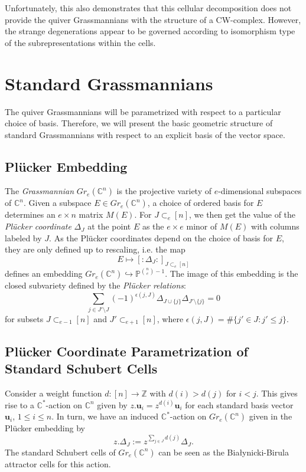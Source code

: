 \documentclass{amsart}
\numberwithin{equation}{section}
\newcommand{\CC}{\mathbb{C}}
\newcommand{\PP}{\mathbb{P}}
\newcommand{\ZZ}{\mathbb{Z}}
\newcommand{\bfu}{\mathbf{u}}
\newcommand{\into}{\hookrightarrow}
\begin{document}
  Unfortunately, this also demonstrates that this cellular decomposition does not provide the quiver Grassmannians with the structure of a CW-complex.
  However, the strange degenerations appear to be governed according to isomorphism type of the subrepresentations within the cells.


\section{Standard Grassmannians}
  \label{sec:standard Grassmannians}

  The quiver Grassmannians will be parametrized with respect to a particular choice of basis.
  Therefore, we will present the basic geometric structure of standard Grassmannians with respect to an explicit basis of the vector space.

  \subsection{Pl\"ucker Embedding}
  The \emph{Grassmannian} $Gr_e(\CC^n)$ is the projective variety of $e$-dimensional subspaces of $\CC^n$.
  Given a subspace $E \in Gr_e(\CC^n)$, a choice of ordered basis for $E$ determines an $e\times n$ matrix $M(E)$.
  For $J \subset_e [n]$, we then get the value of the \emph{Pl\"ucker coordinate} $\Delta_J$ at the point $E$ as the $e\times e$ minor of $M(E)$ with columns labeled by $J$.
  As the Pl\"ucker coordinates depend on the choice of basis for $E$, they are only defined up to rescaling, i.e. the map
  \[E \mapsto [:\Delta_J:]_{J\subset_e[n]}\]
  defines an embedding $Gr_e(\CC^n)\into \PP^{{n \choose e} - 1}$.
  The image of this embedding is the closed subvariety defined by the \emph{Pl\"ucker relations}:
  \begin{equation}
    \label{eq:plucker}
    \sum_{j\in J'\setminus J} (-1)^{\epsilon(j,J)} \Delta_{J\cup\{j\}} \Delta_{J'\setminus\{j\}}=0
  \end{equation}
  for subsets $J \subset_{e-1} [n]$ and $J' \subset_{e+1} [n]$, where $\epsilon(j,J)=\#\{j'\in J:j'\le j\}$.

  \subsection{Pl\"ucker Coordinate Parametrization of Standard Schubert Cells}
  Consider a weight function $d:[n] \to \ZZ$ with $d(i)>d(j)$ for $i<j$.
  This gives rise to a $\CC^*$-action on $\CC^n$ given by $z.\bfu_i=z^{d(i)} \bfu_i$ for each standard basis vector $\bfu_i$, $1 \le i \le n$.
  In turn, we have an induced $\CC^*$-action on $Gr_e(\CC^n)$ given in the Pl\"ucker embedding by 
  \[z.\Delta_J:=z^{\sum_{j\in J} d(j)}\Delta_J.\]
  The standard Schubert cells of $Gr_e(\CC^n)$ can be seen as the Bia\l{}ynicki-Birula attractor cells \cite{bb} for this action.
\end{document}
